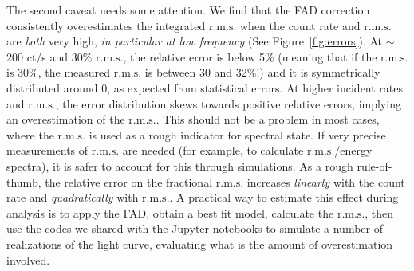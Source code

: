 \documentclass[twocolumn]{aastex61}
\newcommand{\rms}{\ensuremath{\mathrm{r.m.s.}}\xspace}
\begin{document}
The second caveat needs some attention. 
We find that the FAD correction consistently overestimates the integrated \rms when the count rate and \rms are \textit{both} very high, \textit{in particular at low frequency} (See Figure~\ref{fig:errors}).
At $\sim$200 ct/s and 30\% \rms, the relative error is below 5\% (meaning that if the \rms is 30\%, the measured \rms is between 30 and 32\%!) and it is symmetrically distributed around 0, as expected from statistical errors. 
At higher incident rates and \rms, the error distribution skews towards positive relative errors, implying an overestimation of the \rms.
This should not be a problem in most cases, where the \rms is used as a rough indicator for spectral state.
If very precise measurements of \rms are needed (for example, to calculate \rms/energy spectra), it is safer to account for this through simulations.
As a rough rule-of-thumb, the relative error on the fractional \rms increases \textit{linearly} with the count rate and \textit{quadratically} with \rms.
A practical way to estimate this effect during analysis is to apply the FAD, obtain a best fit model, calculate the \rms, then use the codes we shared with the Jupyter notebooks to simulate a number of realizations of the light curve, evaluating what is the amount of overestimation involved.
\end{document}
